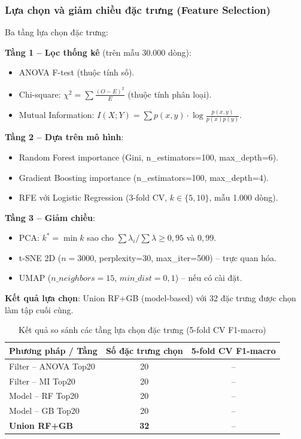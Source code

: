 \documentclass[12pt,a4paper]{article}
\let\oldtextbf\textbf
\renewcommand{\textbf}[1]{\oldtextbf{\textcolor{hcmublue}{#1}}}
\begin{document}
\subsubsection{Lựa chọn và giảm chiều đặc trưng (Feature Selection)}

Ba tầng lựa chọn đặc trưng:

\textbf{Tầng 1 -- Lọc thống kê} (trên mẫu 30.000 dòng):
\begin{itemize}
    \item ANOVA F-test (thuộc tính số).
    \item Chi-square: $\chi^2 = \sum \frac{(O-E)^2}{E}$ (thuộc tính phân loại).
    \item Mutual Information: $I(X;Y) = \sum p(x,y) \cdot \log\frac{p(x,y)}{p(x)p(y)}$.
\end{itemize}

\textbf{Tầng 2 -- Dựa trên mô hình}:
\begin{itemize}
    \item Random Forest importance (Gini, n\_estimators=100, max\_depth=6).
    \item Gradient Boosting importance (n\_estimators=100, max\_depth=4).
    \item RFE với Logistic Regression (3-fold CV, $k \in \{5, 10\}$, mẫu 1.000 dòng).
\end{itemize}

\textbf{Tầng 3 -- Giảm chiều}:
\begin{itemize}
    \item PCA: $k^* = \min k$ sao cho $\sum \lambda_i / \sum \lambda \geq 0{,}95$ và $0{,}99$.
    \item t-SNE 2D ($n = 3000$, perplexity=30, max\_iter=500) -- trực quan hóa.
    \item UMAP ($n\_neighbors =15$, $min\_dist = 0{,}1$) -- nếu có cài đặt.
\end{itemize}

\textbf{Kết quả lựa chọn}: Union RF+GB (model-based) với 32 đặc trưng được chọn làm tập cuối cùng.

\begin{table}[H]
\centering
\begin{tabular}{|l|c|c|}
\hline
\textbf{Phương pháp / Tầng} & \textbf{Số đặc trưng chọn} & \textbf{5-fold CV F1-macro} \\ \hline
Filter -- ANOVA Top20   & 20 & -- \\ \hline
Filter -- MI Top20      & 20 & -- \\ \hline
Model -- RF Top20       & 20 & -- \\ \hline
Model -- GB Top20       & 20 & -- \\ \hline
\textbf{Union RF+GB}    & \textbf{32} & -- \\ \hline
\end{tabular}
\caption{Kết quả so sánh các tầng lựa chọn đặc trưng (5-fold CV F1-macro)}
\label{tab:feat_sel_results}
\end{table}
\end{document}
